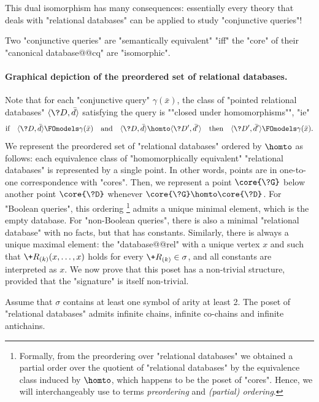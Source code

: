 This dual isomorphism has many consequences: essentially every theory that deals with
"relational databases" can be applied to study "conjunctive queries"!

\begin{corollary}
	Two "conjunctive queries" are "semantically equivalent" "iff"
	the "core" of their "canonical database@@cq" are "isomorphic".
\end{corollary}

\paragraph*{Graphical depiction of the preordered set of relational databases.}
Note that for each "conjunctive query" $\gamma(\bar x)$, the class of
"pointed relational databases" $\tup{\?D, \bar d}$ satisfying the query
is \AP""closed under homomorphisms"", "ie"
\[
	\text{if}\quad \tup{\?D, \bar d} \FOmodels \gamma(\bar x)
	\quad\text{and}\quad \tup{\?D, \bar d} \homto \tup{\?D', \bar d'}
	\quad\text{then}\quad \tup{\?D', \bar d'} \FOmodels \gamma(\bar x).
\]
We represent the preordered set of "relational databases" ordered by $\homto$ as follows:
each equivalence class of "homomorphically equivalent" "relational databases" is
represented by a single point. In other words, points are in one-to-one correspondence
with "cores". Then, we represent a point $\core{\?G}$ below another point $\core{\?D}$
whenever $\core{\?G} \homto \core{\?D}$.
For "Boolean queries", this ordering%
\footnote{Formally, from the preordering over "relational databases" we obtained a partial
order over the quotient of "relational databases" by the equivalence class induced by $\homto$,
which happens to be the poset of "cores". Hence, we will interchangeably
use to terms \emph{preordering} and \emph{(partial) ordering}.}
admits a unique minimal element, which is the empty database.
For "non-Boolean queries", there is also a minimal "relational database" with
no facts, but that has constants.
Similarly, there is always a unique maximal element: the "database@@rel" with
a unique vertex $x$ and such that $\+R_{(k)}(x,\dotsc,x)$ holds for
every $\+R_{(k)} \in \sigma$, and all constants are interpreted as $x$.
We now prove that this poset has a non-trivial structure, provided that the "signature"
is itself non-trivial.

\begin{proposition}
	\AP\label{prop:poset-reldb}
	Assume that $\sigma$ contains at least one symbol of arity at least 2.
	The poset of "relational databases"
	admits infinite chains, infinite co-chains and infinite antichains.
\end{proposition}

